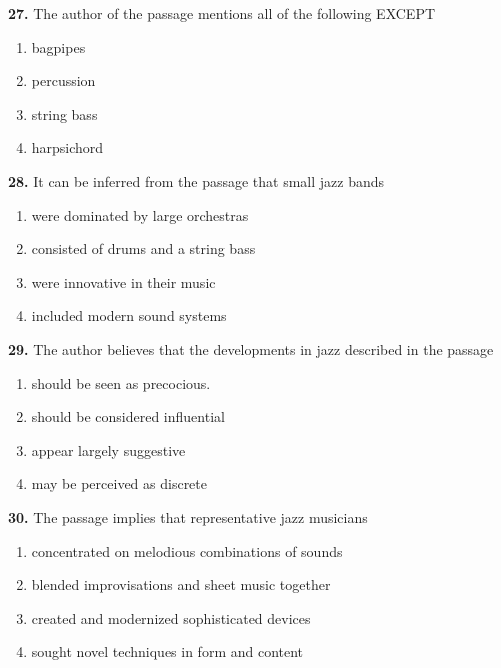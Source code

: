 \documentclass[12pt]{article}
\begin{document}
\vspace{0.25\baselineskip}
\noindent\textbf{27.} The author of the passage mentions all of the following EXCEPT
\begin{enumerate}[label=(\Alph*),leftmargin=*,itemsep=0.2em]
\item bagpipes
\item percussion
\item string bass
\item harpsichord
\end{enumerate}
\par
\vspace{0.25\baselineskip}
\noindent\textbf{28.} It can be inferred from the passage that small jazz bands
\begin{enumerate}[label=(\Alph*),leftmargin=*,itemsep=0.2em]
\item were dominated by large orchestras
\item consisted of drums and a string bass
\item were innovative in their music
\item included modern sound systems
\end{enumerate}
\par
\vspace{0.25\baselineskip}
\noindent\textbf{29.} The author believes that the developments in jazz described in the passage
\begin{enumerate}[label=(\Alph*),leftmargin=*,itemsep=0.2em]
\item should be seen as precocious.
\item should be considered influential
\item appear largely suggestive
\item may be perceived as discrete
\end{enumerate}
\par
\vspace{0.25\baselineskip}
\noindent\textbf{30.} The passage implies that representative jazz musicians
\begin{enumerate}[label=(\Alph*),leftmargin=*,itemsep=0.2em]
\item concentrated on melodious combinations of sounds
\item blended improvisations and sheet music together
\item created and modernized sophisticated devices
\item sought novel techniques in form and content
\end{enumerate}
\par
\end{document}
